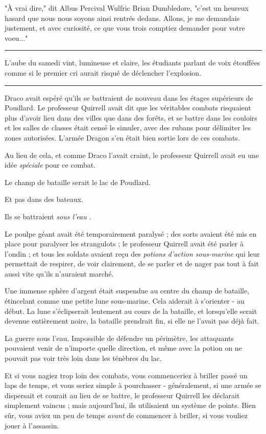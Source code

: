 "À vrai dire," dit Albus Percival Wulfric Brian Dumbledore, "c'est un heureux hasard que nous nous soyons ainsi rentrés dedans. Allons, je me demandais justement, et avec curiosité, ce que vous trois comptiez demander pour votre voeu..."
\par\noindent\rule{\textwidth}{0.4pt}
L'aube du samedi vint, lumineuse et claire, les étudiants parlant de voix étouffées comme si le premier cri aurait risqué de déclencher l'explosion.
\par\noindent\rule{\textwidth}{0.4pt}
Draco avait espéré qu'ils se battraient de nouveau dans les étages supérieurs de Poudlard. Le professeur Quirrell avait dit que les véritables combats risquaient plus d'avoir lieu dans des villes que dans des forêts, et se battre dans les couloirs et les salles de classes était censé le simuler, avec des rubans pour délimiter les zones autorisées. L'armée Dragon s'en était bien sortie lors de ces combats.

Au lieu de cela, et comme Draco l'avait craint, le professeur Quirrell avait eu une idée \emph{spéciale}  pour ce combat.

Le champ de bataille serait le lac de Poudlard.

Et pas dans des bateaux.

Ils se battraient \emph{sous l'eau} .

Le poulpe géant avait été temporairement paralysé ; des sorts avaient été mis en place pour paralyser les strangulots ; le professeur Quirrell avait été parler à l'ondin ; et tous les soldats avaient reçu des \emph{potions d'action sous-marine}  qui leur permettait de respirer, de voir clairement, de se parler et de nager pas tout à fait aussi vite qu'ils n'auraient marché.

Une immense sphère d'argent était suspendue au centre du champ de bataille, étincelant comme une petite lune sous-marine. Cela aiderait à s'orienter - au début. La lune s'éclipserait lentement au cours de la bataille, et lorsqu'elle serait devenue entièrement noire, la bataille prendrait fin, si elle ne l'avait pas déjà fait.

La guerre sous l'eau. Impossible de défendre un périmètre, les attaquants pouvaient venir de n'importe quelle direction, et même avec la potion on ne pouvait pas voir très loin dans les ténèbres du lac.

Et si vous nagiez trop loin des combats, vous commenceriez à briller passé un laps de temps, et vous seriez simple à pourchasser - généralement, si une armée se dispersait et courait au lieu de se battre, le professeur Quirrell les déclarait simplement vaincus ; mais aujourd'hui, ils utilisaient un système de points. Bien sûr, vous aviez un peu de temps \emph{avant}  de commencer à briller, si vous vouliez jouer à l'assassin.

